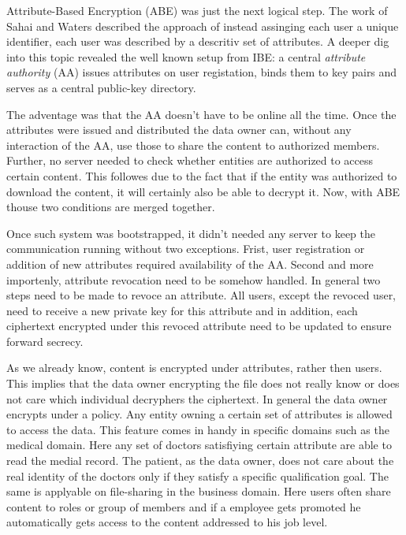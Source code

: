 Attribute-Based Encryption (\ac{ABE}) was just the next logical step. The work of Sahai and Waters \cite{sahai2005fuzzy} described the approach of instead assinging each user a unique identifier, each user was described by a descritiv set of attributes. A deeper dig into this topic revealed the well known setup from \ac{IBE}: a central \textit{attribute authority} (\ac{AA}) issues attributes on user registation, binds them to key pairs and serves as a central public-key directory. 

The adventage was that the \ac{AA} doesn't have to be online all the time. Once the attributes were issued and distributed the data owner can, without any interaction of the \ac{AA}, use those to share the content to authorized members. Further, no server needed to check whether entities are authorized to access certain content. This followes due to the fact that if the entity was authorized to download the content, it will certainly also be able to decrypt it. Now, with \ac{ABE} thouse two conditions are merged together.

Once such system was bootstrapped, it didn't needed any server to keep the communication running without two exceptions. Frist, user registration or addition of new attributes required availability of the \ac{AA}. Second and more importenly, attribute revocation need to be somehow handled. In general two steps need to be made to revoce an attribute. All users, except the revoced user, need to receive a new private key for this attribute and in addition, each ciphertext encrypted under this revoced attribute need to be updated to ensure forward secrecy. 

As we already know, content is encrypted under attributes, rather then users. This implies that the data owner encrypting the file does not really know or does not care which individual decryphers the ciphertext. In general the data owner encrypts under a policy. Any entity owning a certain set of attributes is allowed to access the data. This feature comes in handy in specific domains such as the medical domain. Here any set of doctors satisfiying certain attribute are able to read the medial record. The patient, as the data owner, does not care about the real identity of the doctors only if they satisfy a specific qualification goal. The same is applyable on file-sharing in the business domain. Here users often share content to roles or group of members and if a employee gets promoted he automatically gets access to the content addressed to his job level. 

